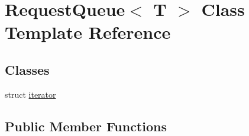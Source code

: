 \hypertarget{classRequestQueue}{\section{Request\-Queue$<$ T $>$ Class Template Reference}
\label{classRequestQueue}
}
\subsection*{Classes}
\begin{DoxyCompactItemize}
\item 
struct \hyperlink{structRequestQueue_1_1iterator}{iterator}
\end{DoxyCompactItemize}
\subsection*{Public Member Functions}
